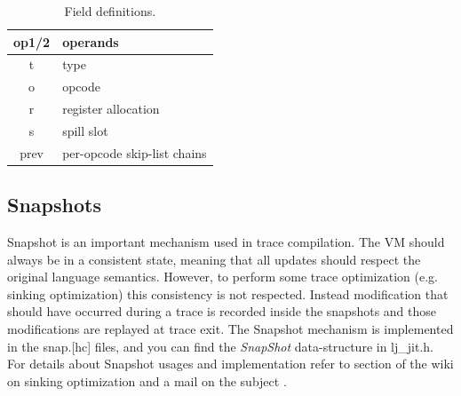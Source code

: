 \begin{table}[H]
\centering
\caption{Field definitions.}
\label{tab:ir-field}
\begin{tabular}{|c|l|}
\hline
op1/2 & operands                    \\ \hline
t     & type                        \\ \hline
o     & opcode                      \\ \hline
r     & register allocation         \\ \hline
s     & spill slot                  \\ \hline
prev  & per-opcode skip-list chains \\ \hline
\end{tabular}
\end{table}


\subsection{Snapshots}
\label{Subsec:snap}

Snapshot is an important mechanism used in trace compilation. The VM should
always be in a consistent state, meaning that all updates should respect the
original language semantics. However, to perform some trace optimization
(e.g. sinking optimization) this consistency is not respected. Instead
modification that should have occurred during a trace is recorded inside the
snapshots and those modifications are replayed at trace exit. The Snapshot
mechanism is implemented in the snap.[hc] files, and you can find the
\emph{SnapShot} data-structure in lj\_jit.h. For details about
Snapshot usages and implementation refer to section of the wiki on sinking
optimization \cite{luajit-sink} and a mail on the subject \cite{luajit-mail-1}.
